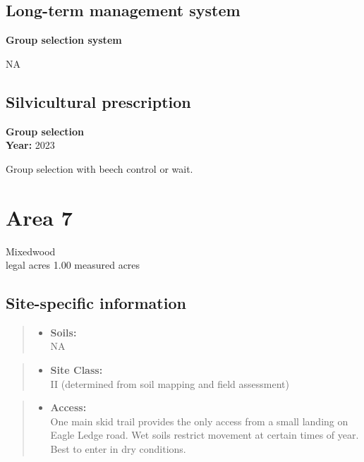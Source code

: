 \documentclass[]{tufte-handout}
\providecommand{\tightlist}{%
  \setlength{\itemsep}{0pt}\setlength{\parskip}{0pt}}
\begin{document}
\subsection{Long-term management
system}\label{long-term-management-system-5}

\textbf{Group selection system}

NA

\subsection{Silvicultural
prescription}\label{silvicultural-prescription-5}

\textbf{Group selection}\\
\noindent \textbf{Year:} 2023

Group selection with beech control or wait.

\newpage

\section{Area 7}\label{area-7}

Mixedwood\\
 legal acres \textbar{} 1.00 measured acres

\subsection{Site-specific
information}\label{site-specific-information-6}

\begin{quote}
\begin{itemize}
\tightlist
\item
  \textbf{Soils:}\\
  \indent\indent  NA
\end{itemize}
\end{quote}

\begin{quote}
\begin{itemize}
\tightlist
\item
  \textbf{Site Class:}\\
  \vspace{2pt} II (determined from soil mapping and field assessment)
\end{itemize}
\end{quote}

\begin{quote}
\begin{itemize}
\tightlist
\item
  \textbf{Access:}\\
  \vspace{2pt} One main skid trail provides the only access from a small
  landing on Eagle Ledge road. Wet soils restrict movement at certain
  times of year. Best to enter in dry conditions.
\end{itemize}
\end{quote}
\end{document}
